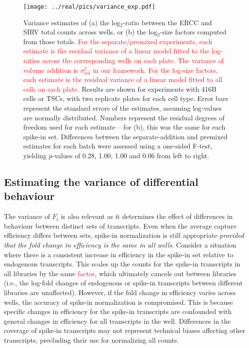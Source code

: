 \documentclass{article}
\newcommand{\revised}[1]{\textcolor{red}{#1}}
\begin{document}
\begin{figure}[btp]
    \begin{center}
        \texttt{[image: ../real/pics/variance\_exp.pdf]}
    \end{center}
    \caption{Variance estimates of (a) the log$_2$-ratio between the ERCC and SIRV total counts across wells, or (b) the log$_2$-size factors computed from those totals.
        \revised{For the separate/premixed experiments, each estimate is the residual variance of a linear model fitted to the log-ratios across the corresponding wells on each plate.
        The variance of volume addition is $\sigma^2_{vol}$ in our framework.
        For the log-size factors, each estimate is the residual variance of a linear model fitted to all cells on each plate.}
        Results are shown for experiments with 416B cells or TSCs, with two replicate plates for each cell type.
        Error bars represent the standard errors of the estimates, assuming log-values are normally distributed.
        Numbers represent the residual degrees of freedom used for each estimate -- for (b), this was the same for each spike-in set.
        Differences between the separate-addition and premixed estimates for each batch were assessed using a one-sided F-test, yielding $p$-values of 0.28, 1.00, 1.00 and 0.06 from left to right.
    }
    \label{fig:varestimates}
\end{figure}

\subsection*{Estimating the variance of differential behaviour}
The variance of $F_i$ is also relevant as it determines the effect of differences in behaviour between distinct sets of transcripts.
Even when the average capture efficiency differs between sets, spike-in normalization is still appropriate \textit{provided that the fold change in efficiency is the same in all wells}.
Consider a situation where there is a consistent increase in efficiency in the spike-in set relative to endogenous transcripts.
This scales up the counts for the spike-in transcripts in all libraries by the same \revised{factor}, which ultimately cancels out between libraries (i.e., the log-fold changes of endogenous or spike-in transcripts between different libraries are unaffected).
However, if the fold change in efficiency varies across wells, the accuracy of spike-in normalization is compromised.
This is because specific changes in efficiency for the spike-in transcripts are confounded with general changes in efficiency for all transcripts in the well.
Differences in the coverage of spike-in transcripts may not represent technical biases affecting other transcripts, precluding their use for normalizing all counts.
\end{document}
